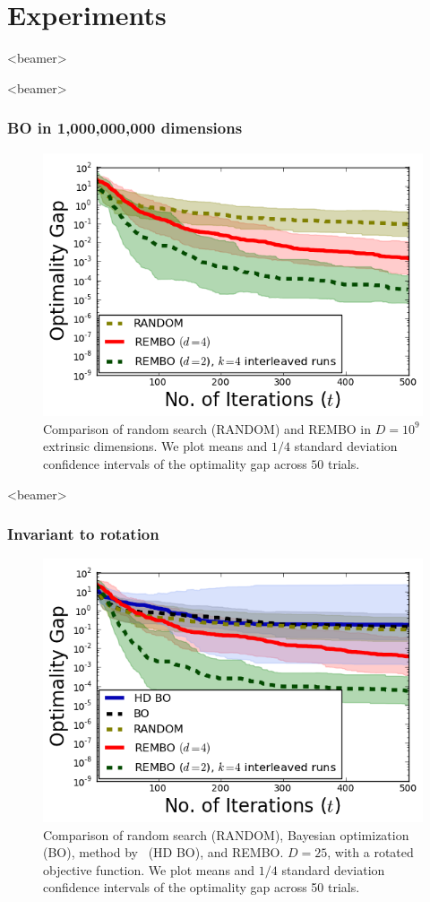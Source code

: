 \documentclass[grey]{beamer}
\begin{document}
 \section{Experiments}
 \begin{frame}<beamer>
  \tableofcontents[currentsection]
 \end{frame}
 
 \begin{frame}<beamer>
  \frametitle{BO in 1,000,000,000 dimensions}
  \begin{figure}
   \includegraphics[width=0.6\columnwidth]{../paper/figures/branin_dis_1b.png}
   \caption{Comparison of random search (RANDOM) and REMBO
     in $D=10^9$ extrinsic dimensions. 
     We plot means and $1/4$ standard deviation confidence intervals of the optimality gap across $50$ trials.}
   \label{fig:standard}
  \end{figure}
 \end{frame}
 
 \begin{frame}<beamer>
  \frametitle{Invariant to rotation}
  
  
  \begin{figure}
   \includegraphics[width=0.6\columnwidth]{../paper/figures/branin_dis_rot.png}
   \caption{Comparison of random search (RANDOM), Bayesian optimization (BO),
     method by~\protect\cite{Chen:2012} (HD BO), and REMBO.
     $D=25$, with a rotated objective function. We plot means and $1/4$ standard deviation confidence intervals of the optimality gap across 50 trials.}
   \label{fig:standard}
  \end{figure}
 \end{frame}
\end{document}
